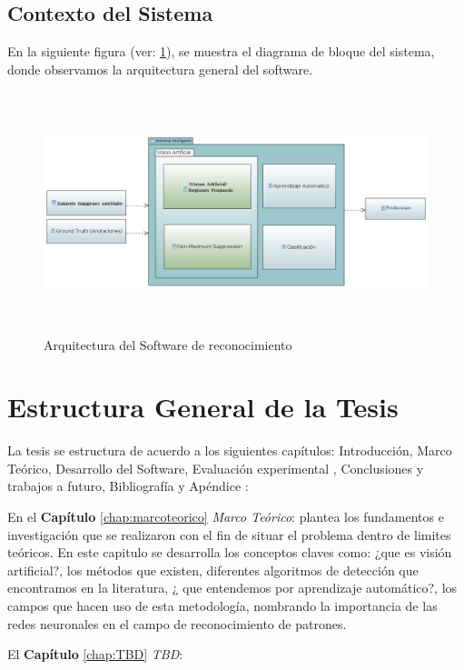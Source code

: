 \subsection{Contexto del Sistema}\label{sub:casodeuso}

En la siguiente figura (ver: \ref{Fig: diagbloque}), se muestra el diagrama de bloque del sistema, donde observamos la arquitectura general del software. 

\begin{figure}[H]
 \centering
  \includegraphics[height=7cm,keepaspectratio=true,clip=true]{imagenes/Logos/diagramabloque.png}
  \caption{Arquitectura del Software de reconocimiento}
	\label{Fig: diagbloque}
 \end{figure}


\section{Estructura General de la Tesis }\label{sec:estructura}

La tesis se estructura de acuerdo a los siguientes capítulos: Introducción, Marco Teórico, Desarrollo del Software, Evaluación experimental , Conclusiones y trabajos a futuro, Bibliografía y Apéndice :

En el \textbf{Capítulo} \ref{chap:marcoteorico} \textit{Marco Teórico}: plantea los fundamentos e investigación que se realizaron con el fin de situar el problema dentro de limites teóricos. En este capitulo se desarrolla los conceptos claves como: ¿que es visión artificial?, los métodos que existen, diferentes algoritmos de detección que encontramos en la literatura, ¿ que entendemos por aprendizaje automático?, los campos que hacen uso de esta metodología, nombrando la importancia de las redes neuronales en el campo de reconocimiento de patrones.

El \textbf{Capítulo} \ref{chap:TBD} \textit{TBD}: 


